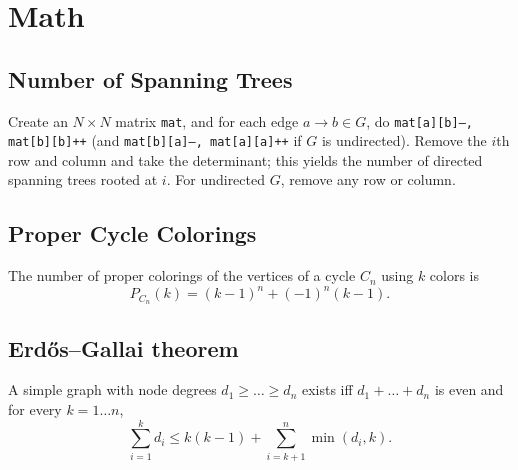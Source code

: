 \section{Math}

	\subsection{Number of Spanning Trees}
		Create an $N\times N$ matrix \texttt{mat}, and for each edge $a \rightarrow b \in G$, do
		\texttt{mat[a][b]--, mat[b][b]++} (and \texttt{mat[b][a]--, mat[a][a]++} if $G$ is undirected).
		Remove the $i$th row and column and take the determinant; this yields the number of directed spanning trees rooted at $i$.
		For undirected $G$, remove any row or column.
		\vspace{0.6em}
	\subsection{Proper Cycle Colorings}
		The number of proper colorings of the vertices of a cycle $C_n$ using $k$ colors is
		\[ P_{C_n}(k) = (k-1)^n + (-1)^n(k-1). \]
	\subsection{Erdős–Gallai theorem}
		A simple graph with node degrees $d_1 \ge \dots \ge d_n$ exists iff $d_1 + \dots + d_n$ is even and for every $k = 1\dots n$,
		\[ \sum _{i=1}^{k}d_{i}\leq k(k-1)+\sum _{i=k+1}^{n}\min(d_{i},k). \]
